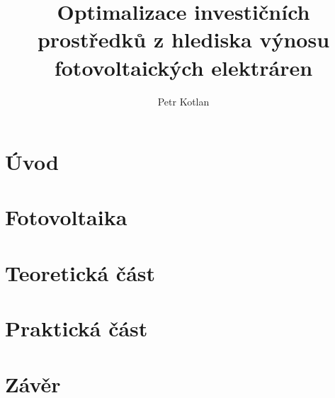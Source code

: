 \documentclass[a4paper, 12pt]{report}
\author{Petr Kotlan}
\title{Optimalizace investičních prostředků z hlediska výnosu fotovoltaických elektráren}
\date{}
\begin{document}

\thispagestyle{empty}
\mbox{}




\thispagestyle{empty}
\mbox{}
\newpage



\thispagestyle{empty}
\mbox{}
\newpage



\thispagestyle{empty}
\mbox{}
\newpage

\tableofcontents


\newpage
\thispagestyle{empty}
\mbox{}
\newpage

\chapter*{Úvod}
\renewcommand{\chaptername}{Úvod}


\chapter{Fotovoltaika}
\renewcommand{\chaptername}{Fotovoltaika}


\chapter{Teoretická část}
\renewcommand{\chaptername}{Teoretická část}




\chapter{Praktická část}
\renewcommand{\chaptername}{Praktická část}


\renewcommand{\chaptername}{Závěr}
\chapter{Závěr}



\end{document}
